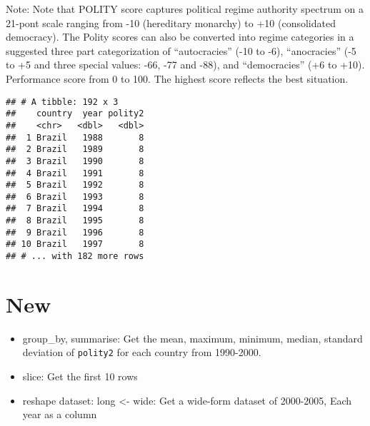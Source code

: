 \documentclass[11pt,]{article}
\newenvironment{Shaded}{\begin{snugshade}}{\end{snugshade}}
\newcommand{\KeywordTok}[1]{\textcolor[rgb]{0.13,0.29,0.53}{\textbf{#1}}}
\newcommand{\DecValTok}[1]{\textcolor[rgb]{0.00,0.00,0.81}{#1}}
\newcommand{\StringTok}[1]{\textcolor[rgb]{0.31,0.60,0.02}{#1}}
\newcommand{\OperatorTok}[1]{\textcolor[rgb]{0.81,0.36,0.00}{\textbf{#1}}}
\newcommand{\NormalTok}[1]{#1}
\providecommand{\tightlist}{%
  \setlength{\itemsep}{0pt}\setlength{\parskip}{0pt}}
\begin{document}
Note: Note that POLITY score captures political regime authority
spectrum on a 21-pont scale ranging from -10 (hereditary monarchy) to
+10 (consolidated democracy). The Polity scores can also be converted
into regime categories in a suggested three part categorization of
``autocracies'' (-10 to -6), ``anocracies'' (-5 to +5 and three special
values: -66, -77 and -88), and ``democracies'' (+6 to +10). Performance
score from 0 to 100. The highest score reflects the best situation.

\begin{Shaded}
\end{Shaded}

\begin{verbatim}
## # A tibble: 192 x 3
##    country  year polity2
##    <chr>   <dbl>   <dbl>
##  1 Brazil   1988       8
##  2 Brazil   1989       8
##  3 Brazil   1990       8
##  4 Brazil   1991       8
##  5 Brazil   1992       8
##  6 Brazil   1993       8
##  7 Brazil   1994       8
##  8 Brazil   1995       8
##  9 Brazil   1996       8
## 10 Brazil   1997       8
## # ... with 182 more rows
\end{verbatim}

\section{New}\label{new}

\begin{itemize}
\tightlist
\item
  group\_by, summarise: Get the mean, maximum, minimum, median, standard
  deviation of \texttt{polity2} for each country from 1990-2000.
\item
  slice: Get the first 10 rows
\item
  reshape dataset: long \textless{}- wide: Get a wide-form dataset of
  2000-2005, Each year as a column
\end{itemize}

\begin{Shaded}
\end{Shaded}
\end{document}
